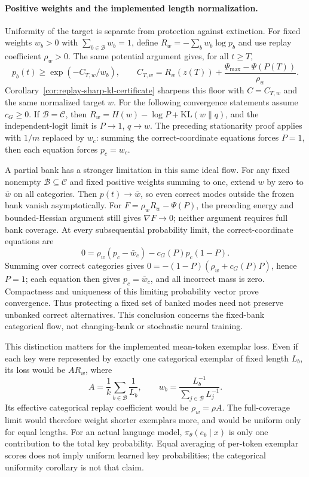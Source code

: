 \paragraph{Positive weights and the implemented length normalization.}
Uniformity of the target is separate from protection against extinction.
For fixed weights $w_b>0$ with $\sum_{b\in\mathcal B}w_b=1$, define
$R_w=-\sum_b w_b\log p_b$ and use replay coefficient $\rho_w>0$.
The same potential argument gives, for all $t\ge T$,
\[
 p_b(t)\ge\exp(-C_{T,w}/w_b),\qquad
 C_{T,w}=R_w(z(T))+\frac{\Psi_{\max}-\Psi(P(T))}{\rho_w}.
\]
Corollary~\ref{cor:replay-sharp-kl-certificate} sharpens this floor with
$C=C_{T,w}$ and the same normalized target $w$.
For the following convergence statements assume $c_G\ge0$.
If $\mathcal B=\mathcal C$, then
$R_w=H(w)-\log P+\mathrm{KL}(w\|q)$, and the independent-logit limit is
$P\to1$, $q\to w$. The preceding stationarity proof applies with $1/m$
replaced by $w_c$: summing the correct-coordinate equations forces $P=1$,
then each equation forces $p_c=w_c$.

A partial bank has a stronger limitation in this same ideal flow. For any
fixed nonempty $\mathcal B\subseteq\mathcal C$ and fixed positive weights
summing to one, extend $w$ by zero to $\bar w$ on all categories. Then
$p(t)\to\bar w$, so even correct modes outside the frozen bank vanish
asymptotically. For $F=\rho_wR_w-\Psi(P)$, the preceding energy and
bounded-Hessian argument still gives $\nabla F\to0$; neither argument
requires full bank coverage.
At every subsequential probability limit, the correct-coordinate equations are
\[
 0=\rho_w(p_c-\bar w_c)-c_G(P)p_c(1-P).
\]
Summing over correct categories gives
$0=-(1-P)(\rho_w+c_G(P)P)$, hence $P=1$; each equation then gives
$p_c=\bar w_c$, and all incorrect mass is zero. Compactness and uniqueness
of this limiting probability vector prove convergence. Thus protecting a
fixed set of banked modes need not preserve unbanked correct alternatives.
This conclusion concerns the fixed-bank categorical flow, not changing-bank
or stochastic neural training.

This distinction matters for the implemented mean-token exemplar loss.
Even if each key were represented by exactly one categorical exemplar of
fixed length $L_b$, its loss would be $A R_w$, where
\[
 A=\frac1k\sum_{b\in\mathcal B}\frac1{L_b},\qquad
 w_b=\frac{L_b^{-1}}{\sum_{j\in\mathcal B}L_j^{-1}}.
\]
Its effective categorical replay coefficient would be $\rho_w=\rho A$.
The full-coverage limit would therefore weight shorter exemplars more, and
would be uniform only for equal lengths. For an actual language model,
$\pi_\theta(e_b\mid x)$ is only one contribution to the total key probability.
Equal averaging of per-token exemplar scores does not imply uniform learned
key probabilities; the categorical uniformity corollary is not that claim.

